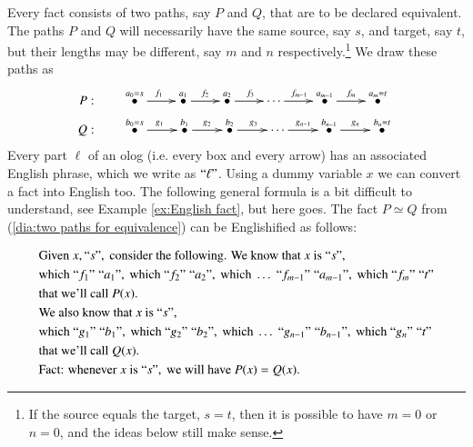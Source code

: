 \documentclass[a4paper]{book}
\def\tn{\textnormal}
\newcommand{\qtE}[1]{\tn{“}#1\tn{”}}
\def\hsp{\hspace{.3in}}
\newcommand{\LMO}[1]{\stackrel{#1}{\bullet}}
\theoremstyle{myth}
\begin{document}
\begin{russian}
Every fact consists of two paths, say $P$ and $Q$, that are to be declared equivalent. The paths $P$ and $Q$ will necessarily have the same source, say $s$, and target, say $t$, but their lengths may be different, say $m$ and $n$ respectively.\footnote{If the source equals the target, $s=t$, then it is possible  to have $m=0$ or $n=0$, and the ideas below still make sense.} 
We draw these paths as 
\begin{align}\label{dia:two paths for equivalence}
P:&\hsp\xymatrix@=22pt{\LMO{a_0=s}\ar[r]^{f_1}&\LMO{a_1}\ar[r]^{f_2}&\LMO{a_2}\ar[r]^{f_3}&\cdots\ar[r]^{f_{m-1}}&\LMO{a_{m-1}}\ar[r]^{f_m}&\LMO{a_m=t}}\\\nonumber
Q:&\hsp\xymatrix@=23pt{\LMO{b_0=s}\ar[r]^{g_1}&\LMO{b_1}\ar[r]^{g_2}&\LMO{b_2}\ar[r]^{g_3}&\cdots\ar[r]^{g_{n-1}}&\LMO{b_{n-1}}\ar[r]^{g_n}&\LMO{b_n=t}}
\end{align}
Every part $\ell$ of an olog (i.e. every box and every arrow) has an associated English phrase, which we write as $\qtE{\ell}$. Using a dummy variable $x$ we can convert a fact into English too. The following general formula is a bit difficult to understand, see Example \ref{ex:English fact}, but here goes. The fact $P\simeq Q$ from (\ref{dia:two paths for equivalence}) can be Englishified as follows:

\begin{align}\label{dia:Englishification}\index{Englishification}
&\tn{Given }x,\qtE{s},\tn{ consider the following. We know that }x\tn{ is }\qtE{s}, \\
\nonumber&\tn{which } \qtE{f_1}\;\qtE{a_1}, \tn{ which } \qtE{f_2}\;\qtE{a_2}, \tn{ which }\ldots \; \qtE{f_{m-1}}\;\qtE{a_{m-1}}, \tn{ which } \qtE{f_m}\;\qtE{t}\\
\nonumber&\tn{that we'll call } P(x).\\
\nonumber&\tn{We also know that }x\tn{ is } \qtE{s},\\
\nonumber&\tn{which } \qtE{g_1}\;\qtE{b_1}, \tn{ which }\qtE{g_2}\;\qtE{b_2}, \tn{ which }\ldots\;\qtE{g_{n-1}}\;\qtE{b_{n-1}}, \tn{ which } \qtE{g_n}\;\qtE{t}\\
\nonumber&\tn{that we'll call } Q(x).\\
\nonumber&\tn{Fact: whenever }x\tn{ is }\qtE{s},\tn{ we will have }P(x)=Q(x).
\end{align}


\end{russian}
\end{document}
